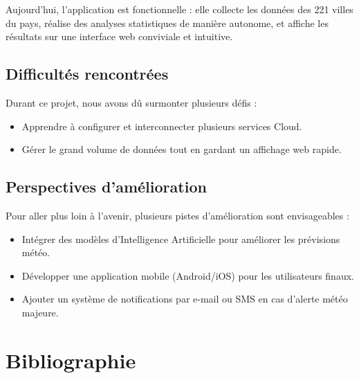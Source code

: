 \documentclass[a4paper,12pt,oneside]{report}
\begin{document}
Aujourd'hui, l'application est fonctionnelle : elle collecte les données des 221 villes du pays, réalise des analyses statistiques de manière autonome, et affiche les résultats sur une interface web conviviale et intuitive.

\section*{Difficultés rencontrées}
Durant ce projet, nous avons dû surmonter plusieurs défis :
\begin{itemize}
  \item Apprendre à configurer et interconnecter plusieurs services Cloud.
  \item Gérer le grand volume de données tout en gardant un affichage web rapide.
\end{itemize}

\section*{Perspectives d'amélioration}
Pour aller plus loin à l'avenir, plusieurs pistes d'amélioration sont envisageables :
\begin{itemize}
  \item Intégrer des modèles d'Intelligence Artificielle pour améliorer les prévisions météo.
  \item Développer une application mobile (Android/iOS) pour les utilisateurs finaux.
  \item Ajouter un système de notifications par e-mail ou SMS en cas d'alerte météo majeure.
\end{itemize}

\chapter*{Bibliographie}
\end{document}
